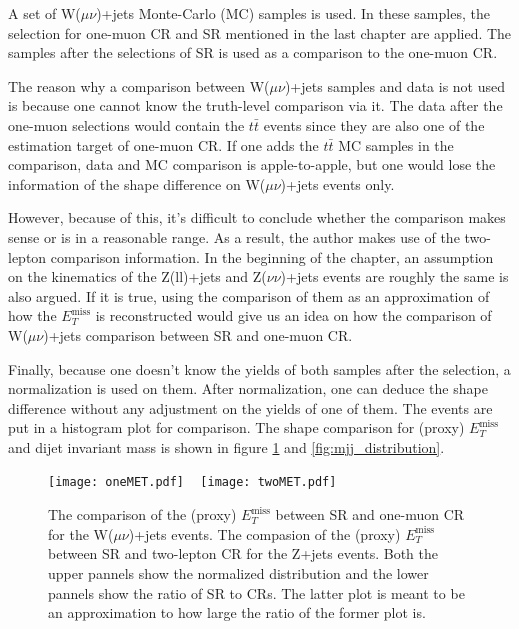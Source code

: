 \documentclass[class=NCU_thesis, crop=false]{standalone}
\begin{document}
		A set of W($\mu \nu$)+jets Monte-Carlo (MC) samples is used. In these samples, the selection for one-muon CR and SR mentioned in the last chapter are applied. The samples after the selections of SR is used as a comparison to the one-muon CR.
		
		The reason why a comparison between W($\mu \nu$)+jets samples and data is not used is because one cannot know the truth-level comparison via it. The data after the one-muon selections would contain the $t\bar{t}$ events since they are also one of the estimation target of one-muon CR. If one adds the $t\bar{t}$ MC samples in the comparison, data and MC comparison is apple-to-apple, but one would lose the information of the shape difference on W($\mu \nu$)+jets events only. 
		
		However, because of this, it's difficult to conclude whether the comparison makes sense or is in a reasonable range. As a result, the author makes use of the two-lepton comparison information. In the beginning of the chapter, an assumption on the kinematics of the Z(ll)+jets and Z($\nu \nu$)+jets events are roughly the same is also argued. If it is true, using the comparison of them as an approximation of how the $E_T^{\mathrm{miss}}$ is reconstructed would give us an idea on how the comparison of W($\mu \nu$)+jets comparison between SR and one-muon CR.

		Finally, because one doesn't know the yields of both samples after the selection, a normalization is used on them. After normalization, one can deduce the shape difference without any adjustment on the yields of one of them. The events are put in a histogram plot for comparison. The shape comparison for (proxy) $E_T^{\mathrm{miss}}$ and dijet invariant mass is shown in figure \ref{fig:MET_comparison} and \ref{fig:mjj_distribution}.

		\begin{figure}[!hbt]
			\centering
			\subcaptionbox
			{\label{fig:subfig_onePTV}}
			{\texttt{[image: oneMET.pdf]}}
			~
			\subcaptionbox
			{\label{fig:subfig_twoPTV}}
			{\texttt{[image: twoMET.pdf]}}
			\caption{The comparison of the (proxy) $E_T^{\mathrm{miss}}$ between SR and one-muon CR for the W($\mu \nu$)+jets events. The compasion of the (proxy) $E_T^{\mathrm{miss}}$ between SR and two-lepton CR for the Z+jets events. Both the upper pannels show the normalized distribution and the lower pannels show the ratio of SR to CRs. The latter plot is meant to be an approximation to how large the ratio of the former plot is.}
			\label{fig:MET_comparison}
		\end{figure}
	
\end{document}
